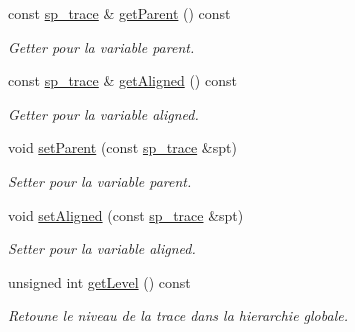 \begin{DoxyCompactItemize}
const \hyperlink{class_trace_a9c58e523529fc8a03fb6acf3eef86150}{sp\+\_\+trace} \& \hyperlink{class_trace_a3d82b8d5984686606bf485112be53354}{get\+Parent} () const 
\begin{DoxyCompactList}\small\item\em Getter pour la variable {\ttfamily parent}. \end{DoxyCompactList}\item 
const \hyperlink{class_trace_a9c58e523529fc8a03fb6acf3eef86150}{sp\+\_\+trace} \& \hyperlink{class_trace_aac433090e2cf94657c61e4c73c3bd530}{get\+Aligned} () const 
\begin{DoxyCompactList}\small\item\em Getter pour la variable {\ttfamily aligned}. \end{DoxyCompactList}\item 
void \hyperlink{class_trace_af1973ce75a2b1a1422bfffdfc1b8e4a2}{set\+Parent} (const \hyperlink{class_trace_a9c58e523529fc8a03fb6acf3eef86150}{sp\+\_\+trace} \&spt)
\begin{DoxyCompactList}\small\item\em Setter pour la variable {\ttfamily parent}. \end{DoxyCompactList}\item 
void \hyperlink{class_trace_ae6552786a5c3b35573c106e4910a5881}{set\+Aligned} (const \hyperlink{class_trace_a9c58e523529fc8a03fb6acf3eef86150}{sp\+\_\+trace} \&spt)
\begin{DoxyCompactList}\small\item\em Setter pour la variable {\ttfamily aligned}. \end{DoxyCompactList}\item 
unsigned int \hyperlink{class_trace_af355f36b176399dd35848562ba38ebea}{get\+Level} () const 
\begin{DoxyCompactList}\small\item\em Retoune le niveau de la trace dans la hierarchie globale. \end{DoxyCompactList}\end{DoxyCompactItemize}
